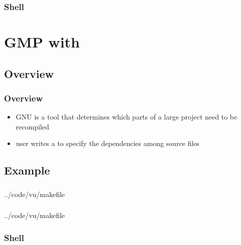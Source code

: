 \begin{frame}
\frametitle{}

\end{frame}

\begin{frame}
\frametitle{Shell}

\end{frame}


\section{GMP with \make}

\subsection{Overview}

\begin{frame}
\frametitle{Overview}
\begin{itemize}
\item GNU \make{} is a tool that determines
  which parts of a large project need to be recompiled
\pause \item user writes a  to specify
  the dependencies among source files
\end{itemize}
\end{frame}

\subsection{Example}

\begin{frame}
\frametitle{}

  {../code/vu/makefile}
\end{frame}
\begin{frame}
\frametitle{}

  {../code/vu/makefile}
\end{frame}

\begin{frame}
\frametitle{Shell}

\end{frame}
